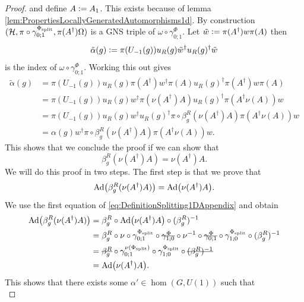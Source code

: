 \documentclass[11pt,a4paper,twoside]{article}
\numberwithin{equation}{section}
\begin{document}
\begin{proof}
		and define $A\vcentcolon= A_1$. This exists because of lemma \ref{lem:PropertiesLocallyGeneratedAutomorphisms1d}. By construction $(\mathcal H,\pi\circ\gamma^{\Phi_{\text{split}}}_{0;1},\pi(A^\dagger)\Omega)$ is a GNS triple of $\omega\circ\gamma^\Phi_{0;1}$. Let $\tilde{w}\vcentcolon= \pi(A^\dagger)w\pi(A)$ then
		\begin{equation}
			\tilde{\alpha}(g)\vcentcolon= \pi(U_{-1}(g))u_R(g)\tilde{w}^\dagger u_R(g)^\dagger \tilde{w}
		\end{equation}
		is the index of $\omega\circ\gamma^\Phi_{0;1}$. Working this out gives
		\begin{align}
			\tilde{\alpha}(g)&=\pi(U_{-1}(g))u_R(g)\pi(A^\dagger)w^\dagger\pi(A)u_R(g)^\dagger\pi(A^\dagger)w\pi(A)\\
			&=\pi(U_{-1}(g))u_R(g)w^\dagger \pi(\nu(A^\dagger)A)u_R(g)^\dagger\pi(A^\dagger\nu(A))w\\
			&=\pi(U_{-1}(g))u_R(g)w^\dagger u_R(g)^\dagger \pi\circ\beta_g^R(\nu(A^\dagger)A)\pi(A^\dagger\nu(A))w\\
			&=\alpha(g)w^\dagger \pi\circ\beta_g^R(\nu(A^\dagger)A)\pi(A^\dagger\nu(A))w.
		\end{align}
		This shows that we conclude the proof if we can show that
		\begin{equation}
			\beta_g^R(\nu(A^\dagger)A)=\nu(A^\dagger)A.
		\end{equation}
		We will do this proof in two steps. The first step is that we prove that
		\begin{equation}\label{eq:ProofThat1DTranslationIndexIsInvariantUnderLGAAdjoints}
			\Ad{\beta_g^R(\nu(A^\dagger)A)}=\Ad{\nu(A^\dagger)A}.
		\end{equation}
		We use the first equation of \eqref{eq:DefinitionSplitting1DAppendix} and obtain
		\begin{align}
			\Ad{\beta_g^R(\nu(A^\dagger)A)}&=\beta_g^R\circ\Ad{\nu(A^\dagger)A}\circ(\beta_g^R)^{-1}\\
			&=\beta_g^R\circ\nu\circ\gamma^{\Phi_{\text{split}}}_{0;1}\circ\stkout{\gamma^{\Phi}_{1;0}}\circ\nu^{-1}\circ\stkout{\gamma^{\Phi}_{0;1}}\circ\gamma^{\Phi_{\text{split}}}_{1;0}\circ(\beta_g^R)^{-1}\\
			&=\stkout{\beta_g^R}\circ\gamma^{\nu(\Phi_{\text{split}})}_{0;1}\circ\gamma^{\Phi_{\text{split}}}_{1;0}\circ\stkout{(\beta_g^R)^{-1}}\\
			&=\Ad{\nu(A^\dagger)A}.
		\end{align}
		This shows that there exists some $\alpha'\in\hom(G,U(1))$ such that
		\begin{equation}

\end{equation}
\end{proof}
\end{document}
